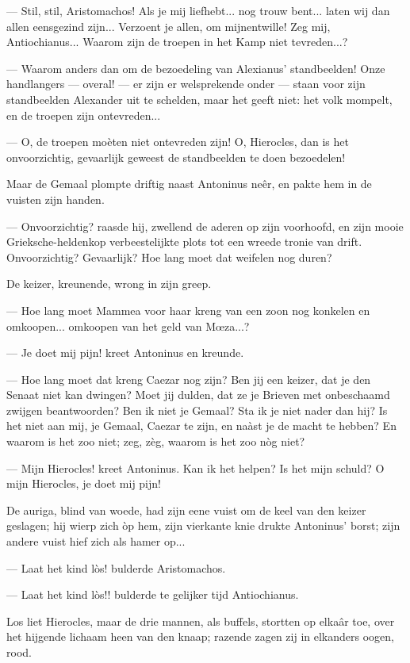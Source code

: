 \documentclass[a4paper, 12pt, oneside, dutch]{article}
\begin{document}
--- Stil, stil, Aristomachos! Als je mij liefhebt... nog trouw bent... laten wij dan allen eensgezind zijn... Verzoent je allen, om mijnentwille! Zeg mij, Antiochianus... Waarom zijn de troepen in het Kamp niet tevreden...?

--- Waarom anders dan om de bezoedeling van Alexianus' standbeelden! Onze handlangers --- overal! --- er zijn er welsprekende onder --- staan voor zijn standbeelden Alexander uit te schelden, maar het geeft niet: het volk mompelt, en de troepen zijn ontevreden...

--- O, de troepen moèten niet ontevreden zijn! O, Hierocles, dan is het onvoorzichtig, gevaarlijk geweest de standbeelden te doen bezoedelen!

Maar de Gemaal plompte driftig naast Antoninus neêr, en pakte hem in de vuisten zijn handen.

--- Onvoorzichtig? raasde hij, zwellend de aderen op zijn voorhoofd, en zijn mooie Grieksche-heldenkop verbeestelijkte plots tot een wreede tronie van drift. Onvoorzichtig? Gevaarlijk? Hoe lang moet dat weifelen nog duren?

De keizer, kreunende, wrong in zijn greep.

--- Hoe lang moet Mammea voor haar kreng van een zoon nog konkelen en omkoopen... omkoopen van het geld van Mœza...?

--- Je doet mij pijn! kreet Antoninus en kreunde.

--- Hoe lang moet dat kreng Caezar nog zijn? Ben jij een keizer, dat je den Senaat niet kan dwingen? Moet jij dulden, dat ze je Brieven met onbeschaamd zwijgen beantwoorden? Ben ik niet je Gemaal? Sta ik je niet nader dan hij? Is het niet aan mij, je Gemaal, Caezar te zijn, en naàst je de macht te hebben? En waarom is het zoo niet; zeg, zèg, waarom is het zoo nòg niet?

--- Mijn Hierocles! kreet Antoninus. Kan ik het helpen? Is het mijn schuld? O mijn Hierocles, je doet mij pijn!

De auriga, blind van woede, had zijn eene vuist om de keel van den keizer geslagen; hij wierp zich òp hem, zijn vierkante knie drukte Antoninus' borst; zijn andere vuist hief zich als hamer op...

--- Laat het kind lòs! bulderde Aristomachos.

--- Laat het kind lòs!! bulderde te gelijker tijd Antiochianus.

Los liet Hierocles, maar de drie mannen, als buffels, stortten op elkaâr toe, over het hijgende lichaam heen van den knaap; razende zagen zij in elkanders oogen, rood.
\end{document}
